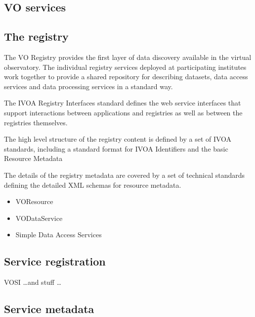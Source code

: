 \documentclass{article}
\begin{document}
\subsection{VO services}

\subsection{The registry}

The VO Registry provides the first layer of data discovery available in the
virtual observatory. The individual registry services deployed at participating
institutes work together to provide a shared repository for describing datasets,
data access services and data processing services in a standard way.

The IVOA Registry Interfaces standard
defines the web service interfaces that support interactions between
applications and registries as well as between the registries themselves.

The high level structure of the registry content is defined by a
set of IVOA standards, including a standard format for IVOA Identifiers
and the basic Resource Metadata

The details of the registry metadata are covered by a set of technical
standards defining the detailed XML schemas for resource metadata.
\begin{itemize}
  \item VOResource
  \item VODataService
  \item Simple Data Access Services
\end{itemize}

\subsection{Service registration}

VOSI \ldots and stuff \ldots

\subsection{Service metadata}
\end{document}
